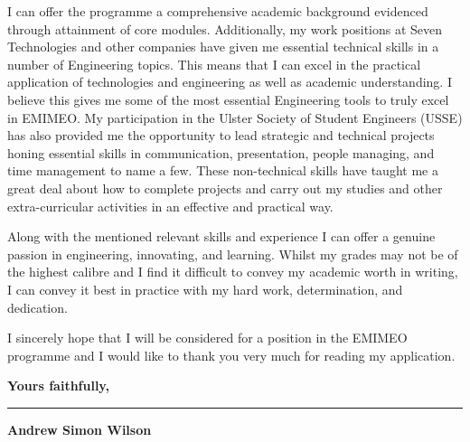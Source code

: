 \documentclass[12pt,a4paper,ragged2e,withhyper]{altacv}
\begin{document}
I can offer the programme a comprehensive academic background evidenced through attainment of core modules. Additionally, my work positions at Seven Technologies and other companies have given me essential technical skills in a number of Engineering topics. This means that I can excel in the practical application of technologies and engineering as well as academic understanding. I believe this gives me some of the most essential Engineering tools to truly excel in EMIMEO. My participation in the Ulster Society of Student Engineers (USSE) has also provided me the opportunity to lead strategic and technical projects honing essential skills in communication, presentation, people managing, and time management to name a few. These non-technical skills have taught me a great deal about how to complete projects and carry out my studies and other extra-curricular activities in an effective and practical way. \linebreak


Along with the mentioned relevant skills and experience I can offer a genuine passion in engineering, innovating, and learning. Whilst my grades may not be of the highest calibre and I find it difficult to convey my academic worth in writing, I can convey it best in practice with my hard work, determination, and dedication. \linebreak


I sincerely hope that I will be considered for a position in the EMIMEO programme and I would like to thank you very much for reading my application.
\vspace{1cm}


\textbf{Yours faithfully,}\\
\vspace{5mm}

{\color{headingrule}\rule{6cm}{1pt}\par} 
\vspace{2mm}
\large\textbf{\color{tagline}Andrew Simon Wilson}
\end{document}
